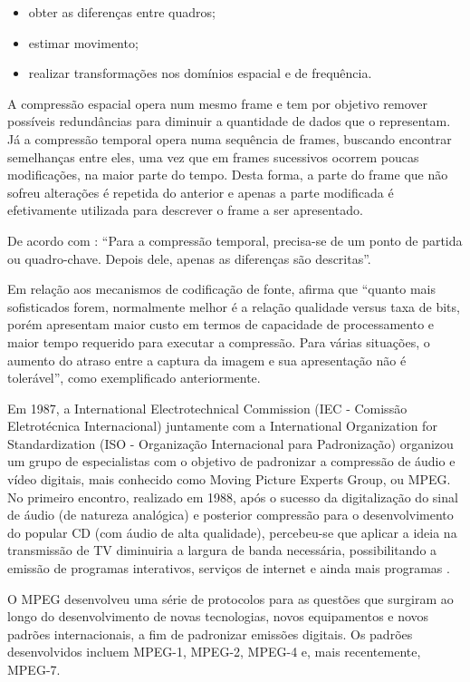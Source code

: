 \begin{itemize}
	\item obter as diferenças entre quadros;
	\item estimar movimento;
	\item realizar transformações nos domínios espacial e de frequência.
\end{itemize}

A compressão espacial opera num mesmo frame e tem por objetivo remover possíveis redundâncias para diminuir a quantidade de dados que o representam. Já a compressão temporal opera numa sequência de frames, buscando encontrar semelhanças entre eles, uma vez que em frames sucessivos ocorrem poucas modificações, na maior parte do tempo. Desta forma, a parte do frame que não sofreu alterações é repetida do anterior e apenas a parte modificada é efetivamente utilizada para descrever o frame a ser apresentado.

De acordo com \cite{rehme}: “Para a compressão temporal, precisa-se de um ponto de partida ou quadro-chave. Depois dele, apenas as diferenças são descritas”.

Em relação aos mecanismos de codificação de fonte, \cite{rehme} afirma que “quanto mais sofisticados forem, normalmente melhor é a relação qualidade versus taxa de bits, porém apresentam maior custo em termos de capacidade de processamento e maior tempo requerido para executar a compressão. Para várias situações, o aumento do atraso entre a captura da imagem e sua apresentação não é tolerável”, como exemplificado anteriormente.

Em 1987, a International Electrotechnical Commission (IEC - Comissão Eletrotécnica Internacional) juntamente com a International Organization for Standardization (ISO - Organização Internacional para Padronização) organizou um grupo de especialistas com o objetivo de padronizar a compressão de áudio e vídeo digitais, mais conhecido como Moving Picture Experts Group, ou MPEG. No primeiro encontro, realizado em 1988, após o sucesso da digitalização do sinal de áudio (de natureza analógica) e posterior compressão para o desenvolvimento do popular CD (com áudio de alta qualidade), percebeu-se que aplicar a ideia na transmissão de TV diminuiria a largura de banda necessária, possibilitando a emissão de programas interativos, serviços de internet e ainda mais programas \cite{mpeg2ref}.

O MPEG desenvolveu uma série de protocolos para as questões que surgiram ao longo do desenvolvimento de novas tecnologias, novos equipamentos e novos padrões internacionais, a fim de padronizar emissões digitais. Os padrões desenvolvidos incluem MPEG-1, MPEG-2, MPEG-4 e, mais recentemente, MPEG-7.

